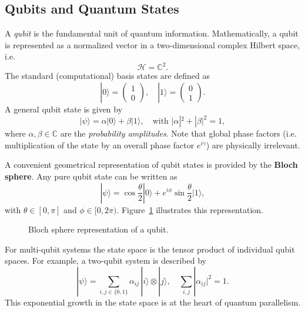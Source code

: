 
\subsection{Qubits and Quantum States}
\label{subsec:qubits}

A \textit{qubit} is the fundamental unit of quantum information. Mathematically, a qubit is represented as a normalized vector in a two-dimensional complex Hilbert space, i.e. 
\[
\mathcal{H} = \mathbb{C}^2.
\]
The standard (computational) basis states are defined as
\[
|0\rangle = \begin{pmatrix} 1 \\ 0 \end{pmatrix}, \quad |1\rangle = \begin{pmatrix} 0 \\ 1 \end{pmatrix}.
\]
A general qubit state is given by
\[
|\psi\rangle = \alpha|0\rangle + \beta|1\rangle, \quad \text{with } |\alpha|^2 + |\beta|^2 = 1,
\]
where $\alpha,\beta \in \mathbb{C}$ are the \textit{probability amplitudes}. Note that global phase factors (i.e. multiplication of the state by an overall phase factor $e^{i\gamma}$) are physically irrelevant.

A convenient geometrical representation of qubit states is provided by the \textbf{Bloch sphere}. Any pure qubit state can be written as
\[
|\psi\rangle = \cos\frac{\theta}{2}|0\rangle + e^{i\phi}\sin\frac{\theta}{2}|1\rangle,
\]
with $\theta \in [0, \pi]$ and $\phi \in [0, 2\pi)$. Figure~\ref{fig:bloch_sphere} illustrates this representation.

\begin{figure}[h]
\centering
{}
\caption{Bloch sphere representation of a qubit.}
\label{fig:bloch_sphere}
\end{figure}

For multi-qubit systems the state space is the tensor product of individual qubit spaces. For example, a two-qubit system is described by
\[
|\psi\rangle = \sum_{i,j \in \{0,1\}} \alpha_{ij}\, |i\rangle \otimes |j\rangle, \quad \sum_{i,j} |\alpha_{ij}|^2 = 1.
\]
This exponential growth in the state space is at the heart of quantum parallelism.
